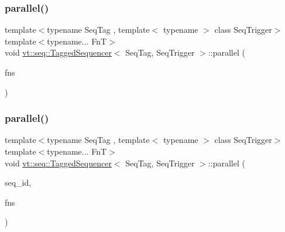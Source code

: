 \mbox{\label{structvt_1_1seq_1_1_tagged_sequencer_a3742a3c79eb8cd4cb92e7beb9d04c0bb}} 
\subsubsection{\texorpdfstring{parallel()}{parallel()}\hspace{0.1cm}{\footnotesize\ttfamily [1/2]}}
{\footnotesize\ttfamily template$<$typename Seq\+Tag , template$<$ typename $>$ class Seq\+Trigger$>$ \\
template$<$typename... FnT$>$ \\
void \hyperlink{structvt_1_1seq_1_1_tagged_sequencer}{vt\+::seq\+::\+Tagged\+Sequencer}$<$ Seq\+Tag, Seq\+Trigger $>$\+::parallel (\begin{DoxyParamCaption}\item[{FnT \&\&...}]{fns }\end{DoxyParamCaption})}

\mbox{\label{structvt_1_1seq_1_1_tagged_sequencer_a7c4bc9187cec9dd34746fb8703a1058c}} 
\subsubsection{\texorpdfstring{parallel()}{parallel()}\hspace{0.1cm}{\footnotesize\ttfamily [2/2]}}
{\footnotesize\ttfamily template$<$typename Seq\+Tag , template$<$ typename $>$ class Seq\+Trigger$>$ \\
template$<$typename... FnT$>$ \\
void \hyperlink{structvt_1_1seq_1_1_tagged_sequencer}{vt\+::seq\+::\+Tagged\+Sequencer}$<$ Seq\+Tag, Seq\+Trigger $>$\+::parallel (\begin{DoxyParamCaption}\item[{\hyperlink{structvt_1_1seq_1_1_tagged_sequencer_a1c8ee839258d0f88c49ef660267a81d5}{Seq\+Type} const \&}]{seq\+\_\+id,  }\item[{FnT \&\&...}]{fns }\end{DoxyParamCaption})}

